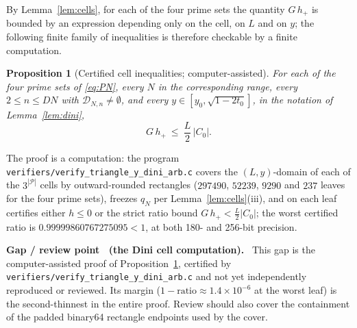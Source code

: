 \documentclass[11pt]{article}
\newtheorem{proposition}[theorem]{Proposition}
\theoremstyle{definition}
\newcounter{gapctr}
\newenvironment{gap}[1]{%
  \refstepcounter{gapctr}%
  \def\FrameCommand{\fboxsep=8pt\fcolorbox{gapred}{gapbg}}%
  \begin{framed}\noindent\textbf{\color{gapred}Gap / review point \thegapctr\ (#1).}\ }%
  {\end{framed}}
\newcommand{\calP}{\mathcal{P}}
\begin{document}
By Lemma~\ref{lem:cells}, for each of the four prime sets the
quantity $G\,h_+$ is bounded by an expression depending only on the
cell, on $L$ and on $y$; the following finite family of
inequalities is therefore checkable by a finite computation.

\begin{proposition}[Certified cell inequalities;
computer-assisted]\label{prop:dinicells}
For each of the four prime sets of \eqref{eq:PN}, every $N$ in the
corresponding range, every $2\le n\le DN$ with
$\mathcal D_{N,n}\neq\emptyset$, and every
$y\in[y_0,\sqrt{1-2t_0}]$, in the notation of
Lemma~\ref{lem:dini},
\[
G\,h_+\ \le\ \frac L2\,|C_0| .
\]
\end{proposition}

The proof is a computation: the program
\texttt{verifiers/verify\_triangle\_y\_dini\_arb.c} covers the
$(L,y)$-domain of each of the $3^{|\calP|}$ cells by outward-rounded
rectangles ($297490$, $52239$, $9290$ and $237$ leaves for the four
prime sets), freezes $q_N$ per Lemma~\ref{lem:cells}(iii), and on
each leaf certifies either $h\le0$ or the strict ratio bound
$G\,h_+<\frac L2|C_0|$; the worst certified ratio is
$0.99999860767275095<1$, at both 180- and 256-bit precision.

\begin{gap}{the Dini cell computation}
\label{gap:dinicells}
This gap is the computer-assisted proof of
Proposition~\ref{prop:dinicells}, certified by
\texttt{verifiers/verify\_triangle\_y\_dini\_arb.c} and not yet
independently reproduced or reviewed. Its margin
($1-\text{ratio}\approx1.4\times10^{-6}$ at the worst leaf) is the
second-thinnest in the entire proof. Review should also cover the
containment of the padded binary64 rectangle endpoints used by the
cover.
\end{gap}
\end{document}
